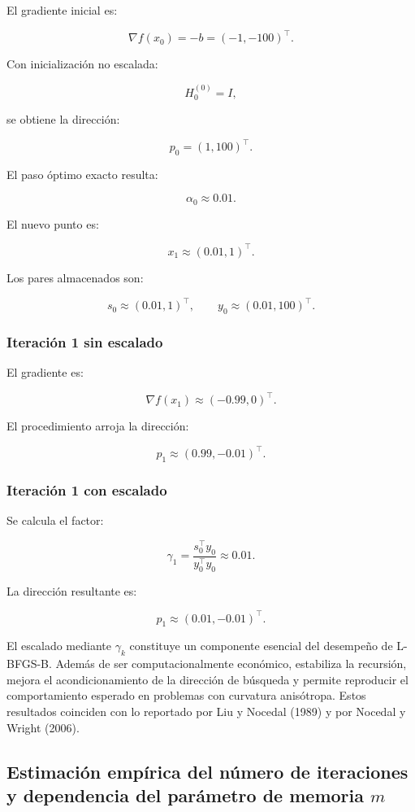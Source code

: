 \documentclass[
  spanish,
  us-letterpaper,
  DIV=11,
  numbers=noendperiod]{scrreprt}
\numberwithin{equation}{section}
\begin{document}
El gradiente inicial es:

\[
\nabla f(x_0) = -b = (-1,-100)^\top.
\]

Con inicialización no escalada:

\[
H_0^{(0)} = I,
\]

se obtiene la dirección:

\[
p_0 = (1,100)^\top.
\]

El paso óptimo exacto resulta:

\[
\alpha_0 \approx 0.01.
\]

El nuevo punto es:

\[
x_1 \approx (0.01, 1)^\top.
\]

Los pares almacenados son:

\[
s_0 \approx (0.01, 1)^\top,
\qquad
y_0 \approx (0.01, 100)^\top.
\]

\subsubsection{Iteración 1 sin
escalado}\label{iteraciuxf3n-1-sin-escalado}

El gradiente es:

\[
\nabla f(x_1) \approx (-0.99, 0)^\top.
\]

El procedimiento arroja la dirección:

\[
p_1 \approx (0.99, -0.01)^\top.
\]

\subsubsection{Iteración 1 con
escalado}\label{iteraciuxf3n-1-con-escalado}

Se calcula el factor:

\[
\gamma_1 =
\frac{s_0^\top y_0}{y_0^\top y_0}
\approx 0.01.
\]

La dirección resultante es:

\[
p_1 \approx (0.01, -0.01)^\top.
\]

El escalado mediante \(\gamma_k\) constituye un componente esencial del
desempeño de L-BFGS-B. Además de ser computacionalmente económico,
estabiliza la recursión, mejora el acondicionamiento de la dirección de
búsqueda y permite reproducir el comportamiento esperado en problemas
con curvatura anisótropa. Estos resultados coinciden con lo reportado
por Liu y Nocedal (1989) y por Nocedal y Wright (2006).

\subsection{\texorpdfstring{Estimación empírica del número de
iteraciones y dependencia del parámetro de memoria
\(m\)}{Estimación empírica del número de iteraciones y dependencia del parámetro de memoria m}}\label{estimaciuxf3n-empuxedrica-del-nuxfamero-de-iteraciones-y-dependencia-del-paruxe1metro-de-memoria-m}
\end{document}
